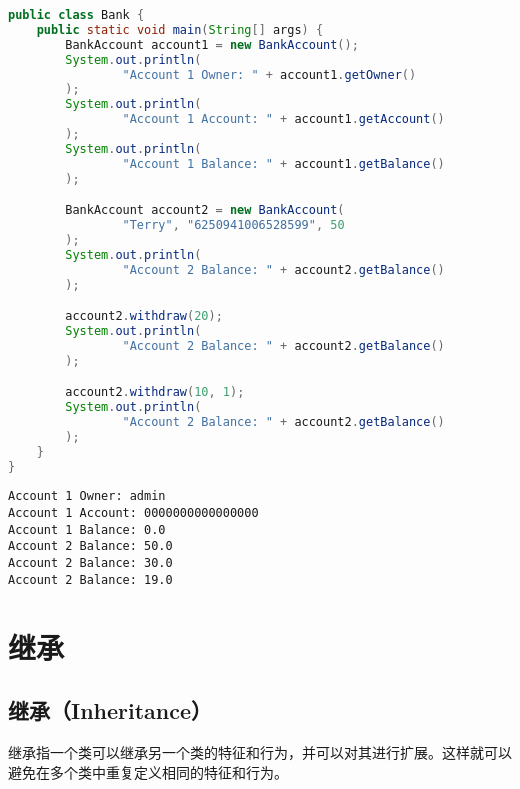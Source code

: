 \begin{lstlisting}[language=Java]
public class Bank {
    public static void main(String[] args) {
        BankAccount account1 = new BankAccount();
        System.out.println(
                "Account 1 Owner: " + account1.getOwner()
        );
        System.out.println(
                "Account 1 Account: " + account1.getAccount()
        );
        System.out.println(
                "Account 1 Balance: " + account1.getBalance()
        );

        BankAccount account2 = new BankAccount(
                "Terry", "6250941006528599", 50
        );
        System.out.println(
                "Account 2 Balance: " + account2.getBalance()
        );

        account2.withdraw(20);
        System.out.println(
                "Account 2 Balance: " + account2.getBalance()
        );

        account2.withdraw(10, 1);
        System.out.println(
                "Account 2 Balance: " + account2.getBalance()
        );
    }
}
\end{lstlisting}

\begin{tcolorbox}
    \begin{verbatim}
Account 1 Owner: admin
Account 1 Account: 0000000000000000
Account 1 Balance: 0.0
Account 2 Balance: 50.0
Account 2 Balance: 30.0
Account 2 Balance: 19.0  
	\end{verbatim}
\end{tcolorbox}

\newpage

\section{继承}

\subsection{继承（Inheritance）}

继承指一个类可以继承另一个类的特征和行为，并可以对其进行扩展。这样就可以避免在多个类中重复定义相同的特征和行为。\\

